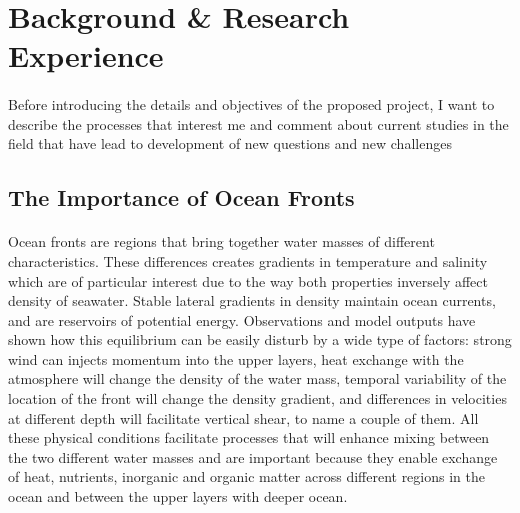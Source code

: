 \documentclass[letterpaper, 12pt ]{article}
\begin{document}
\section*{Background \&  Research Experience}

    \paragraph{}
    Before introducing the details and objectives of the proposed project, I want to describe the processes that interest me and comment about current studies in the field that have lead to development of new questions and new challenges
    
\subsection*{The Importance of Ocean Fronts}

\paragraph{}
    Ocean fronts are regions that bring together water masses of different characteristics. These differences creates gradients in temperature and salinity which are of particular interest due to the way both properties inversely affect density of seawater. Stable lateral gradients in density maintain ocean currents, and are reservoirs of potential energy. Observations and model outputs have shown how this equilibrium can be easily disturb by a wide type of factors: strong wind can injects momentum into the upper layers, heat exchange with the atmosphere will change the density of the water mass, temporal variability of the location of the front will change the density gradient, and differences in velocities at different depth will facilitate vertical shear, to name a couple of them. All these physical conditions facilitate processes that will enhance mixing between the two different water masses and are important because they enable exchange of heat, nutrients, inorganic and organic matter across different regions in the ocean and between the upper layers with deeper ocean. 
    
\end{document}
